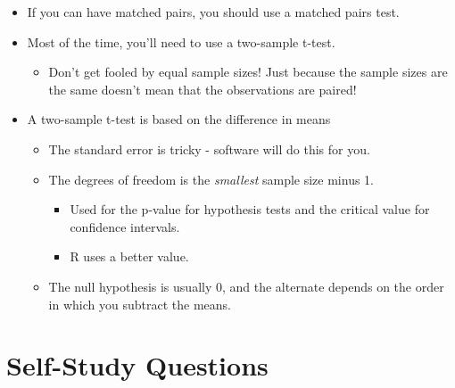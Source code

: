 \documentclass[
  letterpaper,
  DIV=11,
  numbers=noendperiod,
  oneside]{scrreprt}
\providecommand{\tightlist}{%
  \setlength{\itemsep}{0pt}\setlength{\parskip}{0pt}}\usepackage{longtable,booktabs,array}
\begin{document}
\begin{itemize}
\tightlist
\item
  If you can have matched pairs, you should use a matched pairs test.
\item
  Most of the time, you'll need to use a two-sample t-test.

  \begin{itemize}
  \tightlist
  \item
    Don't get fooled by equal sample sizes! Just because the sample
    sizes are the same doesn't mean that the observations are paired!
  \end{itemize}
\item
  A two-sample t-test is based on the difference in means

  \begin{itemize}
  \tightlist
  \item
    The standard error is tricky - software will do this for you.
  \item
    The degrees of freedom is the \emph{smallest} sample size minus 1.

    \begin{itemize}
    \tightlist
    \item
      Used for the p-value for hypothesis tests and the critical value
      for confidence intervals.
    \item
      R uses a better value.
    \end{itemize}
  \item
    The null hypothesis is usually 0, and the alternate depends on the
    order in which you subtract the means.
  \end{itemize}
\end{itemize}

\hypertarget{self-study-questions-7}{%
\section{Self-Study Questions}\label{self-study-questions-7}}
\end{document}
